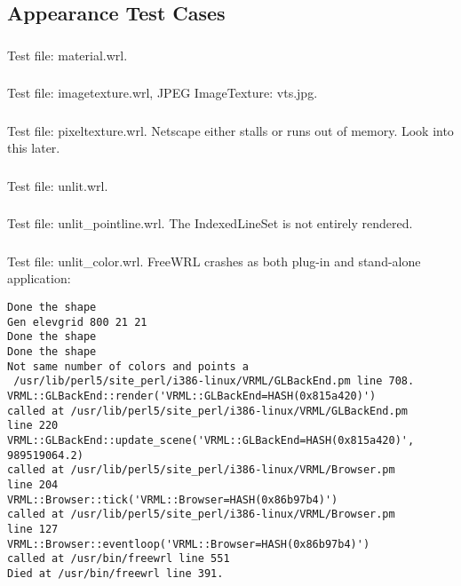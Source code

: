 \subsection{Appearance Test Cases}

\subsubsection{\AppA}
Test file: material.wrl.

\subsubsection{\AppB}
\label{sec:imagetexture}
Test file: imagetexture.wrl, JPEG ImageTexture: vts.jpg.

\subsubsection{\AppC}
Test file: pixeltexture.wrl.\newline
Netscape either stalls or runs out of memory.
Look into this later.

\subsubsection{\AppDa\AppDb}
\label{sec:unlit}
Test file: unlit.wrl.

\subsubsection{\AppE}
Test file: unlit\_pointline.wrl.\newline
The IndexedLineSet is not entirely rendered.

\subsubsection{\AppF}
Test file: unlit\_color.wrl.\newline
FreeWRL crashes as both plug-in and stand-alone application:
\begin{verbatim}
Done the shape
Gen elevgrid 800 21 21
Done the shape
Done the shape
Not same number of colors and points a
 /usr/lib/perl5/site_perl/i386-linux/VRML/GLBackEnd.pm line 708.
VRML::GLBackEnd::render('VRML::GLBackEnd=HASH(0x815a420)')
called at /usr/lib/perl5/site_perl/i386-linux/VRML/GLBackEnd.pm
line 220
VRML::GLBackEnd::update_scene('VRML::GLBackEnd=HASH(0x815a420)',
989519064.2)
called at /usr/lib/perl5/site_perl/i386-linux/VRML/Browser.pm
line 204
VRML::Browser::tick('VRML::Browser=HASH(0x86b97b4)')
called at /usr/lib/perl5/site_perl/i386-linux/VRML/Browser.pm
line 127
VRML::Browser::eventloop('VRML::Browser=HASH(0x86b97b4)')
called at /usr/bin/freewrl line 551
Died at /usr/bin/freewrl line 391.
\end{verbatim}

